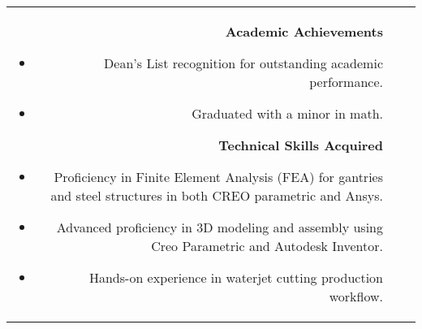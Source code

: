 \documentclass[allblack]{simplehipstercv}
\begin{document}
\begin{paracol}{2}
\begin{tabular}{r| p{} c}
{\begin{itemize}
            \end{itemize}
            \textbf{Academic Achievements}
            \begin{itemize}
                \item Dean's List recognition for outstanding academic performance.
                \item Graduated with a minor in math.
            \end{itemize}
            \textbf{Technical Skills Acquired}
            \begin{itemize}
                \item Proficiency in Finite Element Analysis (FEA) for gantries and steel structures in both CREO parametric and Ansys.
                \item Advanced proficiency in 3D modeling and assembly using Creo Parametric and Autodesk Inventor.
                \item Hands-on experience in waterjet cutting production workflow.
            \end{itemize}
        } \\
        

\end{tabular}
\end{paracol}
\end{document}
